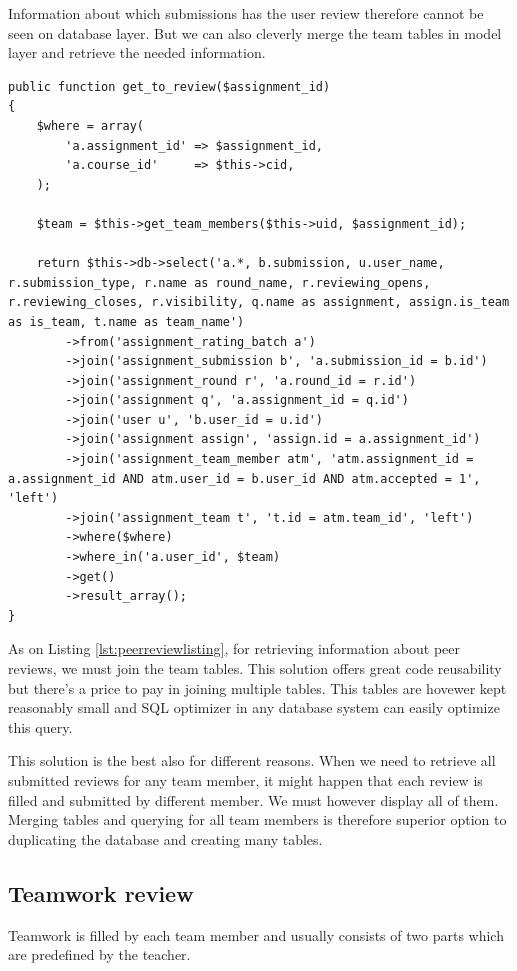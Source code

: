 Information about which submissions has the user review therefore cannot be seen on database layer. But we can also cleverly merge the team tables in model layer and retrieve the needed information.

\begin{lstlisting}[caption={Retrieving information about peer reviews},label={lst:peerreviewlisting}]
public function get_to_review($assignment_id)
{
    $where = array(
        'a.assignment_id' => $assignment_id,
        'a.course_id'     => $this->cid,
    );

    $team = $this->get_team_members($this->uid, $assignment_id);

    return $this->db->select('a.*, b.submission, u.user_name, r.submission_type, r.name as round_name, r.reviewing_opens, r.reviewing_closes, r.visibility, q.name as assignment, assign.is_team as is_team, t.name as team_name')
        ->from('assignment_rating_batch a')
        ->join('assignment_submission b', 'a.submission_id = b.id')
        ->join('assignment_round r', 'a.round_id = r.id')
        ->join('assignment q', 'a.assignment_id = q.id')
        ->join('user u', 'b.user_id = u.id')
        ->join('assignment assign', 'assign.id = a.assignment_id')
        ->join('assignment_team_member atm', 'atm.assignment_id = a.assignment_id AND atm.user_id = b.user_id AND atm.accepted = 1', 'left')
        ->join('assignment_team t', 't.id = atm.team_id', 'left')
        ->where($where)
        ->where_in('a.user_id', $team)
        ->get()
        ->result_array();
}
\end{lstlisting}

As on Listing \ref{lst:peerreviewlisting}, for retrieving information about peer reviews, we must join the team tables. This solution offers great code reusability but there's a price to pay in joining multiple tables. This tables are hovewer kept reasonably small and SQL optimizer in any database system can easily optimize this query.

This solution is the best also for different reasons. When we need to retrieve all submitted reviews for any team member, it might happen that each review is filled and submitted by different member. We must however display all of them. Merging tables and querying for all team members is therefore superior option to duplicating the database and creating many tables.  

\subsection{Teamwork review}
\label{sec:teamreview}
Teamwork is filled by each team member and usually consists of two parts which are predefined by the teacher. 


